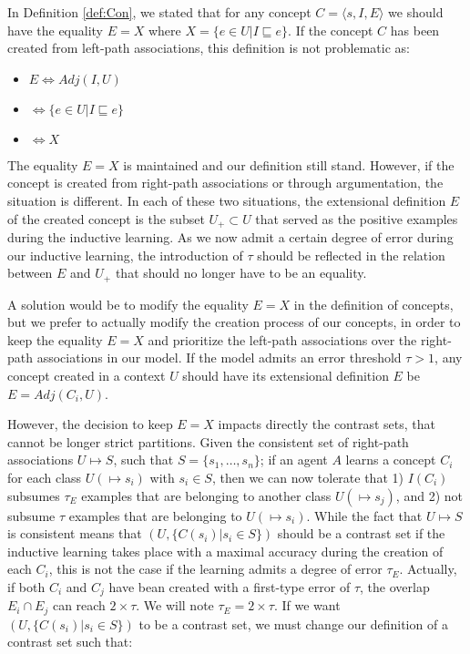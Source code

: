 In Definition \ref{def:Con}, we stated that for any concept $C = \langle s, I, E \rangle$ we should have the equality $E = X$ where $X = \{ e \in U | I \sqsubseteq e \}$. If the concept $C$ has been created from left-path associations, this definition is not problematic as: 

\begin{itemize}
    \item $E \Leftrightarrow Adj(I,U)$
    \item $\Leftrightarrow \{ e \in U | I \sqsubseteq e \}$
    \item $\Leftrightarrow X$
\end{itemize}

The equality $E = X$ is maintained and our definition still stand. However, if the concept is created from right-path associations or through argumentation, the situation is different. In each of these two situations, the extensional definition $E$ of the created concept is the subset $U_{+} \subset U$ that served as the positive examples during the inductive learning. As we now admit a certain degree of error during our inductive learning, the introduction of $\tau$ should be reflected in the relation between $E$ and $U_{+}$ that should no longer have to be an equality.

A solution would be to modify the equality $E = X$ in the definition of concepts, but we prefer to actually modify the creation process of our concepts, in order to keep the equality $E = X$ and prioritize the left-path associations over the right-path associations in our model. If the model admits an error threshold $\tau > 1$, any concept created in a context $U$ should have its extensional definition $E$ be $E = Adj(C_{i}, U)$.

However, the decision to keep $E = X$ impacts directly the contrast sets, that cannot be longer strict partitions. Given the consistent set of right-path associations $U \mapsto S$, such that $S = \{s_{1}, \ldots, s_{n} \}$; if an agent $A$ learns a concept $C_{i}$ for each class $U(\mapsto s_{i})$ with $s_{i} \in S$, then we can now tolerate that 1) $I(C_{i})$ subsumes $\tau_{E}$ examples that are belonging to another class $U(\mapsto s_{j})$, and 2) not subsume $\tau$ examples that are belonging to $U(\mapsto s_{i})$. While the fact that $U \mapsto S$ is consistent means that $(U, \{ C(s_{i}) | s_{i} \in S \})$ should be a contrast set if the inductive learning takes place with a maximal accuracy during the creation of each $C_{i}$, this is not the case if the learning admits a degree of error $\tau_{E}$. Actually, if both $C_{i}$ and $C_{j}$ have bean created with a first-type error of $\tau$, the overlap $E_{i} \cap E_{j}$ can reach $2 \times \tau$. We will note $\tau_{E} = 2 \times \tau$. If we want $(U, \{ C(s_{i}) | s_{i} \in S \})$ to be a contrast set, we must change our definition of a contrast set such that:

